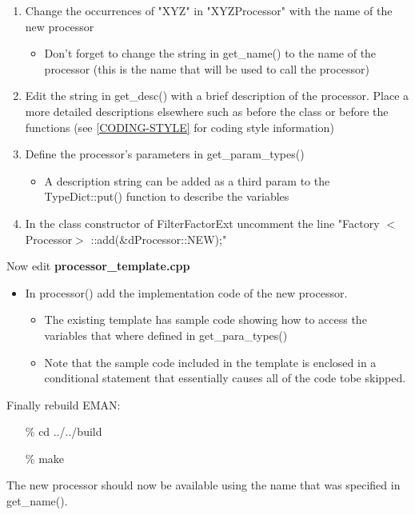       \begin{enumerate}
	\item
	  Change the occurrences of "XYZ" in "XYZProcessor" with the name of
	  the new processor
	  \begin{itemize}
	    \item
	      Don't forget to change the string in get\_name() to the name of
	      the processor (this is the name that will be used to
	      call the processor)
	  \end{itemize}
	\item
	  Edit the string in get\_desc() with a brief description of the
	  processor.  Place a more detailed descriptions elsewhere such as
          before the class or before the functions (see
	  \ref{CODING-STYLE} for coding style information)
	\item
	  Define the processor's parameters in get\_param\_types()
	  \begin{itemize}
	    \item
	      A description string can be added as a third param to the
	      TypeDict::put() function to describe the variables 
	  \end{itemize}
	\item
	  In the class constructor of FilterFactorExt uncomment the line
	  "Factory $<$Processor$>$ ::add(\&dProcessor::NEW);"
      \end{enumerate}

      Now edit \textbf{processor\_template.cpp}
      
      \begin{itemize}
	\item
	  In processor() add the implementation code of the new
	  processor.
	  \begin{itemize}
	    \item
	      The existing template has sample code showing how to access the
	      variables that where defined in get\_para\_types()
	    \item
	      Note that the sample code included in the template is enclosed in
	      a conditional statement that essentially causes all of
	      the code tobe skipped.
	  \end{itemize}
      \end{itemize}

      Finally rebuild EMAN:
      \begin{itemize}
	\item[\%] cd ../../build
	\item[\%] make
      \end{itemize}
      \normalcolor
      The new processor should now be available using the name that was
      specified in get\_name().



